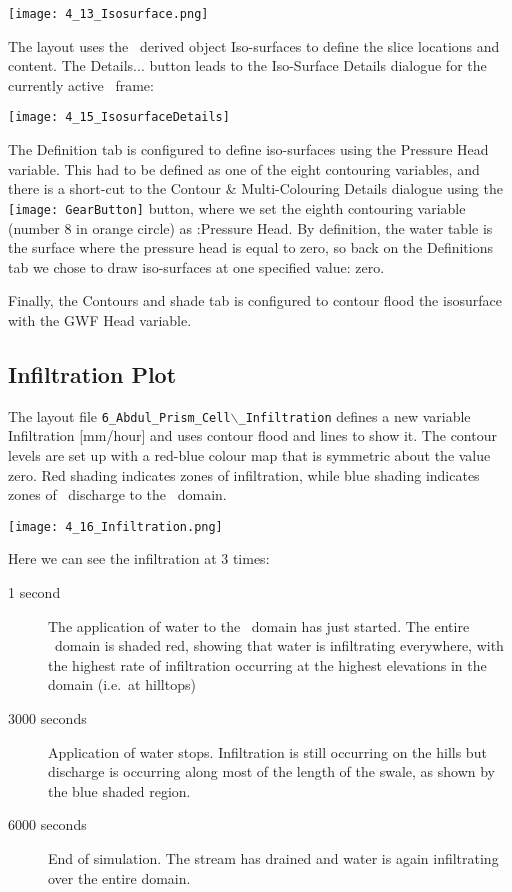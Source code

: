         \texttt{[image: 4\_13\_Isosurface.png]}

The layout uses the \tecplot\ derived object {\sf Iso-surfaces} to define the slice locations and content. The {\sf Details...} button leads to the {\sf Iso-Surface Details} dialogue for the currently active \gwf\ frame:

        \texttt{[image: 4\_15\_IsosurfaceDetails]}

The {\sf Definition} tab is configured to define iso-surfaces using the {\sf Pressure Head} variable. This had to be defined as one of the eight contouring variables, and there is a short-cut to the {\sf Contour \& Multi-Colouring Details} dialogue using the \texttt{[image: GearButton]} button, where we set the eighth contouring variable (number 8 in orange circle) as {:Pressure Head}.  By definition, the water table is the surface where the pressure head is equal to zero, so back on the {\sf Definitions} tab we chose to draw iso-surfaces at one specified value: zero.

Finally, the {\sf Contours and shade} tab is configured to contour flood the isosurface with the {\sf GWF Head} variable.

\subsection{Infiltration Plot}
The layout file {\tt 6\_Abdul\_Prism\_Cell$\backslash$\_Infiltration} defines a new variable {\sf Infiltration [mm/hour]} and uses contour flood and lines to show it.  The contour levels are set up with a red-blue colour map that is symmetric about the value zero. Red shading indicates zones of infiltration, while blue shading indicates zones of \gwf\ discharge to the \swf\ domain.

        \texttt{[image: 4\_16\_Infiltration.png]}

Here we can see the infiltration at 3 times:
\begin{description}
\item [1 second] The application of water to the \swf\ domain has just started.  The entire \swf\ domain is shaded red, showing that water is infiltrating everywhere, with the highest rate of infiltration occurring at the highest elevations in the domain (i.e.\ at hilltops)
\item [3000 seconds] Application of water stops.  Infiltration is still occurring on the hills but discharge is occurring along most of the length of the swale, as shown by the blue shaded region.
\item [6000 seconds] End of simulation.  The stream has drained and water is again infiltrating over the entire  domain.
\end{description}

